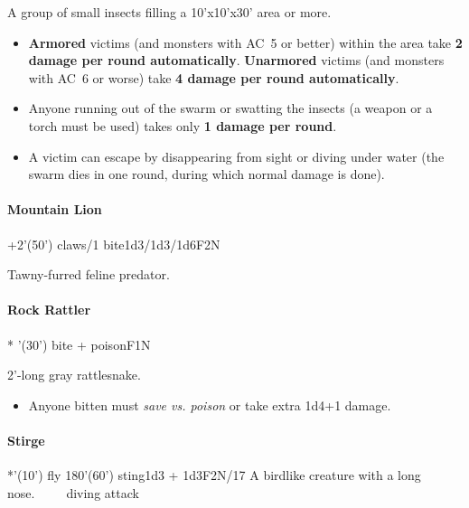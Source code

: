 \documentclass[english,11pt,openany,letterpaper,twocolumn]{book}
\begin{document}
A group of small insects filling a 10'x10'x30' area or more.
\begin{itemize}[leftmargin=*,label=\itshape\textbullet]
\item
\textbf{Armored} victims (and monsters with AC~5 or better) within the area take \textbf{2 damage per round automatically}. \textbf{Unarmored} victims (and monsters with AC~6 or worse) take \textbf{4 damage per round automatically}.
\item
Anyone running out of the swarm or swatting the insects (a weapon or a torch must be used) takes only \textbf{1 damage per round}.
\item
A victim can escape by disappearing from sight or diving under water (the swarm dies in one round, during which normal damage is done).
\end{itemize}


\setAnimalTabPositions{}

\skipline\skipline
\hypertarget{lion}{}
\paragraph{Mountain Lion}
+2'(50') claws/1 bite\tab 1d3/1d3/1d6\tab F2\tab N

Tawny-furred feline predator.


\skipline\skipline
\hypertarget{rattler}{}
\paragraph{Rock Rattler}
* '(30') bite + poison\tab F1\tab N

2'-long gray rattlesnake.
\begin{itemize}[leftmargin=*,label=\itshape\textbullet]
\item
Anyone bitten must \emph{save vs. poison} or take extra 1d4+1 damage.
\end{itemize}

%

\skipline\skipline
\hypertarget{stirge}{}
\paragraph{Stirge}
*'(10') fly 180'(60') sting\tab 1d3 + 1d3\tab F2\tab N/17
A birdlike creature with a long nose.\tab~~~~~\hfill diving attack\op{|}{\^{}}~
\end{document}
